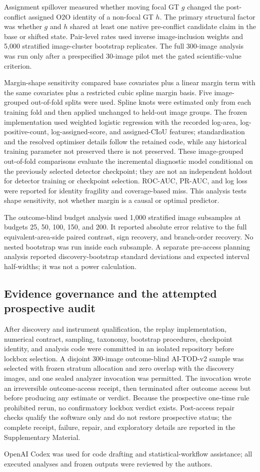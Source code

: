 Assignment spillover measured whether moving focal GT $g$ changed the post-conflict assigned O2O identity of a non-focal GT $h$. The primary structural factor was whether $g$ and $h$ shared at least one native pre-conflict candidate claim in the base or shifted state. Pair-level rates used inverse image-inclusion weights and 5,000 stratified image-cluster bootstrap replicates. The full 300-image analysis was run only after a prespecified 30-image pilot met the gated scientific-value criterion.

Margin-shape sensitivity compared base covariates plus a linear margin term with the same covariates plus a restricted cubic spline margin basis. Five image-grouped out-of-fold splits were used. Spline knots were estimated only from each training fold and then applied unchanged to held-out image groups. The frozen implementation used weighted logistic regression with the recorded log-area, log-positive-count, log-assigned-score, and assigned-CIoU features; standardisation and the resolved optimiser details follow the retained code, while any historical training parameter not preserved there is not preserved. These image-grouped out-of-fold comparisons evaluate the incremental diagnostic model conditional on the previously selected detector checkpoint; they are not an independent holdout for detector training or checkpoint selection. ROC-AUC, PR-AUC, and log loss were reported for identity fragility and coverage-based miss. This analysis tests shape sensitivity, not whether margin is a causal or optimal predictor.

The outcome-blind budget analysis used 1,000 stratified image subsamples at budgets 25, 50, 100, 150, and 200. It reported absolute error relative to the full equivalent-area-side paired contrast, sign recovery, and branch-order recovery. No nested bootstrap was run inside each subsample. A separate pre-access planning analysis reported discovery-bootstrap standard deviations and expected interval half-widths; it was not a power calculation.

\subsection{Evidence governance and the attempted prospective audit}

After discovery and instrument qualification, the replay implementation, numerical contract, sampling, taxonomy, bootstrap procedures, checkpoint identity, and analysis code were committed in an isolated repository before lockbox selection. A disjoint 300-image outcome-blind AI-TOD-v2 sample was selected with frozen stratum allocation and zero overlap with the discovery images, and one sealed analyzer invocation was permitted. The invocation wrote an irreversible outcome-access receipt, then terminated after outcome access but before producing any estimate or verdict. Because the prospective one-time rule prohibited rerun, no confirmatory lockbox verdict exists. Post-access repair checks qualify the software only and do not restore prospective status; the complete receipt, failure, repair, and exploratory details are reported in the Supplementary Material.

OpenAI Codex was used for code drafting and statistical-workflow assistance; all executed analyses and frozen outputs were reviewed by the authors.
